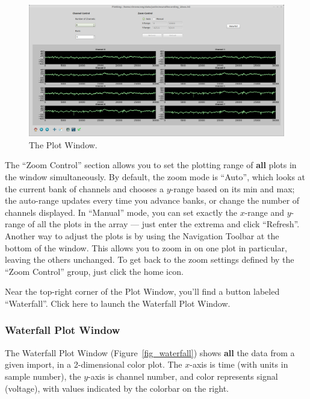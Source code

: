 \begin{figure}[h!]
\begin{center}
\includegraphics[width=17cm]{screenshots/plotwindow.png}
\end{center}
\caption{The Plot Window.}
\label{fig_plotwindow}
\end{figure}

The ``Zoom Control'' section allows you to set the plotting range of \textbf{all} plots in the window simultaneously. By default, the zoom mode is ``Auto'', which looks at the current bank of channels and chooses a $y$-range based on its min and max; the auto-range updates every time you advance banks, or change the number of channels displayed. In ``Manual'' mode, you can set exactly the $x$-range and $y$-range of all the plots in the array --- just enter the extrema and click ``Refresh''. Another way to adjust the plots is by using the Navigation Toolbar at the bottom of the window. This allows you to zoom in on one plot in particular, leaving the others unchanged. To get back to the zoom settings defined by the ``Zoom Control'' group, just click the home icon.

Near the top-right corner of the Plot Window, you'll find a button labeled ``Waterfall''. Click here to launch the Waterfall Plot Window.

\subsubsection{Waterfall Plot Window}
\label{sec_usage_plot_waterfall}

The Waterfall Plot Window (Figure~\ref{fig_waterfall}) shows \textbf{all} the data from a given import, in a 2-dimensional color plot. The $x$-axis is time (with units in sample number), the $y$-axis is channel number, and color represents signal (voltage), with values indicated by the colorbar on the right.

